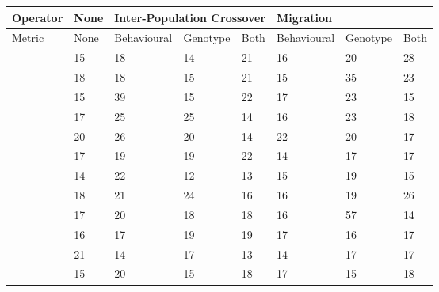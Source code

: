\documentclass[12pt]{article} %
\begin{document}
\begin{sidewaystable} \centering \scriptsize
    \begin{tabular}{|l|l|l|l|l|l|l|l|}
    \hline
    Operator & None        & \multicolumn{3}{l|}{Inter-Population Crossover} & \multicolumn{3}{l|}{Migration} \\ \hline
    Metric   & None        & Behavioural                & Genotype    & Both        & Behavioural & Genotype    & Both        \\ \hline
    ~        & 15          & 18                         & 14          & 21          & 16          & 20          & 28          \\ \hline
    ~        & 18          & 18                         & 15          & 21          & 15          & 35          & 23          \\ \hline
    ~        & 15          & 39                         & 15          & 22          & 17          & 23          & 15          \\ \hline
    ~        & 17          & 25                         & 25          & 14          & 16          & 23          & 18          \\ \hline
    ~        & 20          & 26                         & 20          & 14          & 22          & 20          & 17          \\ \hline
    ~        & 17          & 19                         & 19          & 22          & 14          & 17          & 17          \\ \hline
    ~        & 14          & 22                         & 12          & 13          & 15          & 19          & 15          \\ \hline
    ~        & 18          & 21                         & 24          & 16          & 16          & 19          & 26          \\ \hline
    ~        & 17          & 20                         & 18          & 18          & 16          & 57          & 14          \\ \hline
    ~        & 16          & 17                         & 19          & 19          & 17          & 16          & 17          \\ \hline
    ~        & 21          & 14                         & 17          & 13          & 14          & 17          & 17          \\ \hline
    ~        & 15          & 20                         & 15          & 18          & 17          & 15          & 18          \\ \hline

\end{tabular}
\end{sidewaystable}
\end{document}
